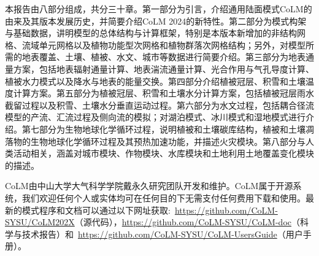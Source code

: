 本报告由八部分组成，共分三十章。第一部分为引言，介绍通用陆面模式CoLM的由来及其版本发展历史，并简要介绍CoLM 2024的新特性。第二部分为模式构架与基础数据，讲明模型的总体结构与计算框架，特别是本版本新增加的非结构网格、流域单元网格以及植物功能型次网格和植物群落次网格结构；另外，对模型所需的地表覆盖、土壤、植被、水文、城市等数据进行简要介绍。第三部分为地表通量方案，包括地表辐射通量计算、地表湍流通量计算、光合作用与气孔导度计算、植被水力模式以及降水与地表的能量交换。第四部分介绍植被冠层、积雪和土壤温度计算方案。第五部分为植被冠层、积雪和土壤水分计算方案，包括植被冠层雨水截留过程以及积雪、土壤水分垂直运动过程。第六部分为水文过程，包括耦合径流模型的产流、汇流过程及侧向流的模拟；对湖泊模式、冰川模式和湿地模式进行介绍。第七部分为生物地球化学循环过程，说明植被和土壤碳库结构，植被和土壤凋落物的生物地球化学循环过程及其预热加速功能，并描述火灾模块。第八部分与人类活动相关，涵盖对城市模块、作物模块、水库模块和土地利用土地覆盖变化模块的描述。

CoLM由中山大学大气科学学院戴永久研究团队开发和维护。CoLM属于开源系统，我们欢迎任何个人或实体均可在任何目的下无需支付任何费用下载和使用。最新的模式程序和文档可以通过以下网址获取:~\url{https://github.com/CoLM-SYSU/CoLM202X}（源代码），\url{https://github.com/CoLM-SYSU/CoLM-doc}（科学与技术报告）和~\url{https://github.com/CoLM-SYSU/CoLM-UsersGuide}（用户手册）。
